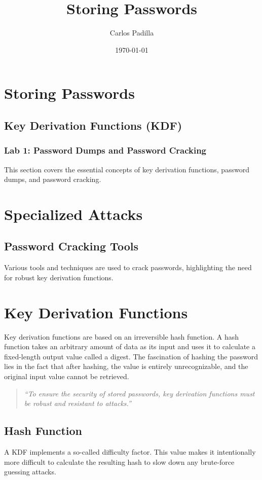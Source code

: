 \documentclass[12pt, apa, man, natbib]{apa6}
\title{Storing Passwords}
\author{Carlos Padilla}
\affiliation{Institute of Cybersecurity}
\date{\today}
\begin{document}
\maketitle

\section{Storing Passwords}
\subsection{Key Derivation Functions (KDF)}
\subsubsection{Lab 1: Password Dumps and Password Cracking}
This section covers the essential concepts of key derivation functions, password dumps, and password cracking.

\section{Specialized Attacks}
\subsection{Password Cracking Tools}
Various tools and techniques are used to crack passwords, highlighting the need for robust key derivation functions.

\section{Key Derivation Functions}
Key derivation functions are based on an irreversible hash function. A hash function takes an arbitrary amount of data as its input and uses it to calculate a fixed-length output value called a digest. The fascination of hashing the password lies in the fact that after hashing, the value is entirely unrecognizable, and the original input value cannot be retrieved.

\begin{quote}
    \textit{“To ensure the security of stored passwords, key derivation functions must be robust and resistant to attacks.”}
\end{quote}

\subsection{Hash Function}
A KDF implements a so-called difficulty factor. This value makes it intentionally more difficult to calculate the resulting hash to slow down any brute-force guessing attacks.
\end{document}
